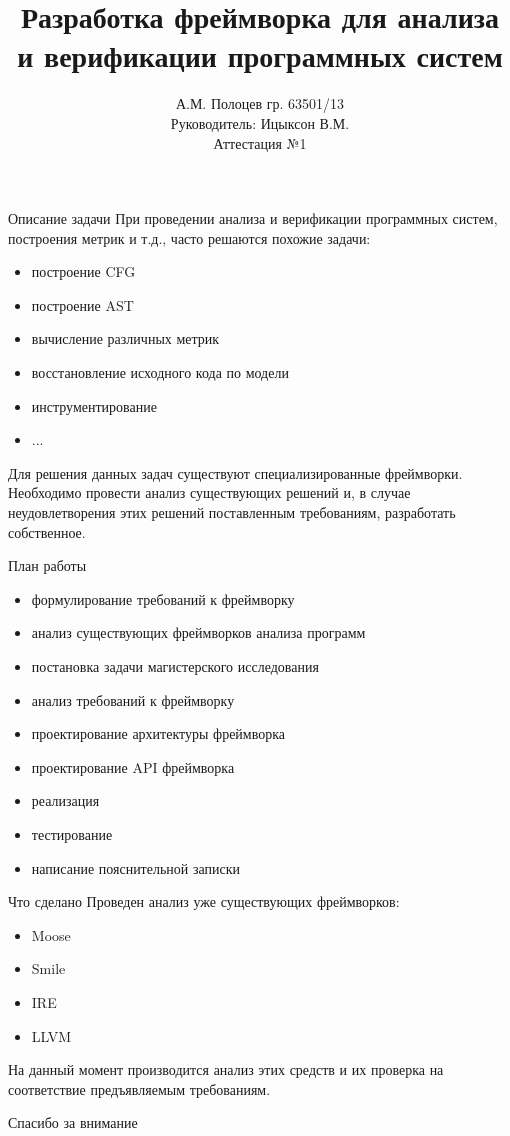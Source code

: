 \documentclass{beamer}
\title[Разработка фреймворка]
{Разработка фреймворка для анализа и верификации программных систем}
\author[А.М. Полоцев]{
    А.М. Полоцев гр. 63501/13\\
    Руководитель: Ицыксон В.М.\\
    Аттестация №1
}
\date[18.10.2013]{}
\begin{document}
\frame{\titlepage}

\begin{frame}{Описание задачи}
    При проведении анализа и верификации программных систем,
    построения метрик и т.д., часто решаются похожие задачи:
    \begin{itemize}
        \item построение CFG
        \item построение AST
        \item вычисление различных метрик
        \item восстановление исходного кода по модели
        \item инструментирование
        \item ...
    \end{itemize}
    Для решения данных задач существуют специализированные фреймворки.
    Необходимо провести анализ существующих решений и, в случае неудовлетворения
    этих решений поставленным требованиям, разработать собственное.
\end{frame}

\begin{frame}{План работы}
    \begin{itemize}
        \item[\checkmark] формулирование требований к фреймворку
        \item[\checkmark] анализ существующих фреймворков анализа программ
        \item постановка задачи магистерского исследования
        \item анализ требований к фреймворку
        \item проектирование архитектуры фреймворка
        \item проектирование API фреймворка
        \item реализация
        \item тестирование
        \item написание пояснительной записки
    \end{itemize}
\end{frame}

\begin{frame}{Что сделано}
    Проведен анализ уже существующих фреймворков:
    \begin{itemize}
        \item Moose
        \item Smile
        \item IRE
        \item LLVM
    \end{itemize}
    На данный момент производится анализ этих средств и их проверка на
    соответствие предъявляемым требованиям.
\end{frame}

\begin{frame}{Спасибо за внимание}
\end{frame}
\end{document}
